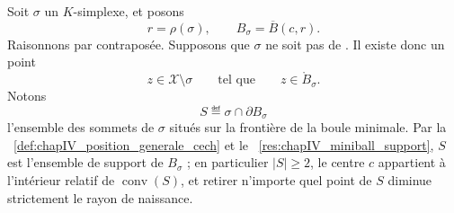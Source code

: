 \begin{Preuve}
Soit $\sigma$ un $K$-simplexe, et posons
\[
    r=\rho(\sigma),
    \qquad
    B_\sigma=\overline B(c,r).
\]
Raisonnons par contraposée. Supposons que $\sigma$ ne soit pas de . Il existe donc un point
\[
    z\in \mathcal X\setminus\sigma
    \qquad\text{tel que}\qquad
    z\in\mathring{B}_\sigma.
\]
Notons
\[
    S\eqdef \sigma\cap\partial B_\sigma
\]
l'ensemble des sommets de $\sigma$ situés sur la frontière de la boule minimale. Par la \Def~\ref{def:chapIV_position_generale_cech} et le \Res~\ref{res:chapIV_miniball_support}, $S$ est l'ensemble de support de $B_\sigma$ ; en particulier $|S|\ge2$, le centre $c$ appartient à l'intérieur relatif de $\operatorname{conv}(S)$, et retirer n'importe quel point de $S$ diminue strictement le rayon de naissance.





            

\end{Preuve}
